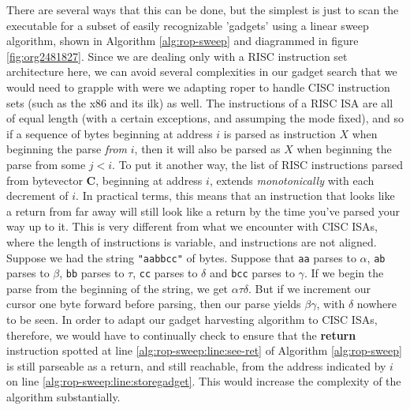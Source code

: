 \documentclass[12pt,glossary]{dalthesis}
\begin{document}
There are several ways that this can be done, but the simplest is just to
scan the executable for a subset of easily recognizable 'gadgets' using a
linear sweep algorithm, shown in Algorithm \ref{alg:rop-sweep} and diagrammed 
in figure \ref{fig:org2481827}. Since we are
dealing only with a RISC instruction set architecture here, we can avoid 
several complexities in our gadget search that we would need to grapple with
were we adapting \gls{roper} to handle CISC instruction sets (such as the x86 and
its ilk) as well. The instructions of a RISC ISA are all of equal length
(with a certain exceptions, and assumping the mode fixed), and so if a
sequence of bytes beginning at address \(i\) is parsed as instruction \(X\)
when beginning the parse \emph{from} \(i\), then it will also be parsed as \(X\)
when beginning the parse from some \(j < i\). To put it another way, the
list of RISC instructions parsed from bytevector \(\mathbf{C}\), beginning
at address \(i\), extends \emph{monotonically} with each decrement of \(i\).
In practical terms, this means that an instruction that looks like a
return from far away will still look like a return by the time you've parsed your
way up to it. This is very different from what we encounter with CISC ISAs,
where the length of instructions is variable, and instructions are not aligned.
Suppose we had the string \texttt{"aabbcc"} of bytes. Suppose that \texttt{aa} parses to
\(\alpha\), \texttt{ab} parses to \(\beta\), \texttt{bb} parses to \(\tau\), \texttt{cc} parses to \(\delta\) and
\texttt{bcc} parses to \(\gamma\). If we begin the parse from the beginning of the string,
we get \(\alpha \tau \delta\). But if we increment our cursor one byte forward
before parsing, then our parse yields \(\beta \gamma\), with \(\delta\) nowhere
to be seen. In order to adapt our gadget harvesting algorithm to CISC ISAs,
therefore, we would have to continually check to ensure that the \textbf{return}
instruction spotted at line \ref{alg:rop-sweep:line:see-ret} of
Algorithm \ref{alg:rop-sweep} is still parseable as a return, and still reachable, from
the address indicated by \(i\) on line \ref{alg:rop-sweep:line:storegadget}. This
would increase the complexity of the algorithm substantially. 
\end{document}
